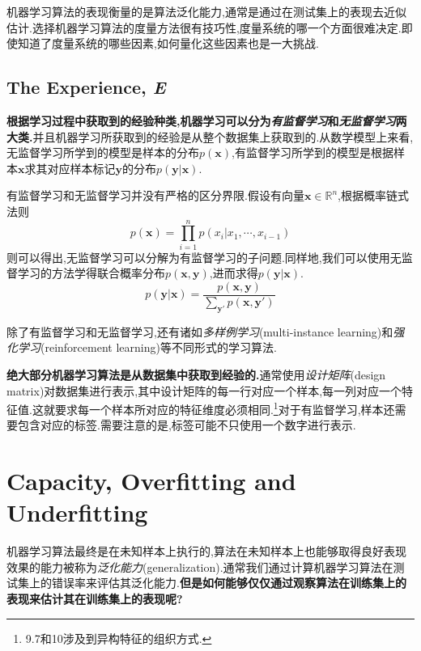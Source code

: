 机器学习算法的表现衡量的是算法泛化能力,通常是通过在测试集上的表现去近似估计.选择机器学习算法的度量方法很有技巧性,度量系统的哪一个方面很难决定.即使知道了度量系统的哪些因素,如何量化这些因素也是一大挑战.

\subsection{The Experience, \textit E}

\textbf{根据学习过程中获取到的经验种类,机器学习可以分为\textit{有监督学习}和\textit{无监督学习}两大类.}并且机器学习所获取到的经验是从整个数据集上获取到的.从数学模型上来看,无监督学习所学到的模型是样本的分布$p(\mathbf x)$,有监督学习所学到的模型是根据样本$\mathbf x$求其对应样本标记$\mathbf y$的分布$p(\mathbf y|\mathbf x)$.

有监督学习和无监督学习并没有严格的区分界限.假设有向量$\mathbf x\in\mathbb R^n$,根据概率链式法则
\begin{equation}
p(\mathbf x)=\prod_{i=1}^np(x_i|x_1,\cdots,x_{i-1})
\end{equation}
则可以得出,无监督学习可以分解为有监督学习的子问题.同样地,我们可以使用无监督学习的方法学得联合概率分布$p(\mathbf x, \mathbf y)$,进而求得$p(\mathbf y|\mathbf x)$.
\begin{equation}
p(\mathbf y|\mathbf x)=\frac{p(\mathbf{x,y})}{\sum_{\mathbf y'}p(\mathbf x,\mathbf y')}
\end{equation}

除了有监督学习和无监督学习,还有诸如\textit{多样例学习}(multi-instance learning)和\textit{强化学习}(reinforcement learning)等不同形式的学习算法.

\textbf{绝大部分机器学习算法是从数据集中获取到经验的.}通常使用\textit{设计矩阵}(design matrix)对数据集进行表示,其中设计矩阵的每一行对应一个样本,每一列对应一个特征值.这就要求每一个样本所对应的特征维度必须相同.\footnote{9.7和10涉及到异构特征的组织方式.}对于有监督学习,样本还需要包含对应的标签.需要注意的是,标签可能不只使用一个数字进行表示.

\section{Capacity, Overfitting and Underfitting}

机器学习算法最终是在未知样本上执行的,算法在未知样本上也能够取得良好表现效果的能力被称为\textit{泛化能力}(generalization).通常我们通过计算机器学习算法在测试集上的错误率来评估其泛化能力.\textbf{但是如何能够仅仅通过观察算法在训练集上的表现来估计其在训练集上的表现呢?}

